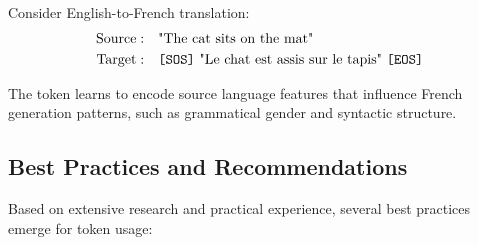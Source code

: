 \begin{example}
Consider English-to-French translation:
\begin{align}
\text{Source}: &\quad \text{"The cat sits on the mat"} \\
\text{Target}: &\quad \text{\texttt{[SOS]}{} "Le chat est assis sur le tapis" \texttt{[EOS]}{}}
\end{align}

The \sos{} token learns to encode source language features that influence French generation patterns, such as grammatical gender and syntactic structure.
\end{example}

\subsection{Best Practices and Recommendations}

Based on extensive research and practical experience, several best practices emerge for \sos{} token usage:

